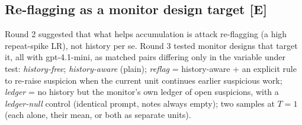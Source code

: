 \documentclass[11pt]{article}
\newcommand{\tE}{\textsf{\scriptsize\textcolor{ink2}{[E]}}\xspace}
\begin{document}
\subsection{Re-flagging as a monitor design target \tE}
Round 2 suggested that what helps accumulation is attack re-flagging (a high repeat-spike LR), not history per se. Round 3 tested monitor designs that target it, all with gpt-4.1-mini, as matched pairs differing only in the variable under test: \emph{history-free}; \emph{history-aware} (plain); \emph{reflag} = history-aware + an explicit rule to re-raise suspicion when the current unit continues earlier suspicious work; \emph{ledger} = no history but the monitor's own ledger of open suspicions, with a \emph{ledger-null} control (identical prompt, notes always empty); two samples at $T=1$ (each alone, their mean, or both as separate units).
\end{document}
